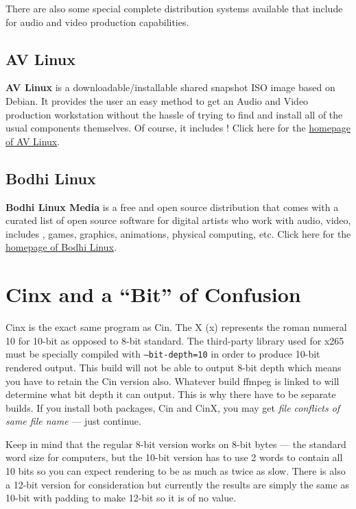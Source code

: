 There are also some special complete distribution systems
available that include \CGG{} for audio and video production
capabilities.

\subsection{AV Linux}
\label{sec:AV_Linux}

\textbf{AV Linux} is a downloadable/installable shared snapshot
ISO image based on Debian.  It provides the user an easy method to
get an Audio and Video production workstation without the hassle
of trying to find and install all of the usual components
themselves.  Of course, it includes \CGG{}!
%
Click here for the
\href{http://www.bandshed.net/avlinux/}{homepage of AV Linux}.

\subsection{Bodhi Linux}
\label{sec:Bodhi_Linux}

\textbf{Bodhi Linux Media} is a free and open source distribution that
comes with a curated list of open source software for digital
artists who work with audio, video, includes \CGG{}, games,
graphics, animations, physical computing, etc.
%
Click here for the
\href{https://gitlab.com/giuseppetorre/bodhilinuxmedia}{homepage of Bodhi Linux}.


\section{Cinx and a “Bit” of Confusion}%
\label{sec:cinx_and_a_bit_of_confusion}

Cinx is the exact same program as Cin.  The X (x) represents the
roman numeral 10 for 10-bit as opposed to 8-bit standard.  The
third-party library used for x265 must be specially compiled with
\texttt{--bit-depth=10} in order to produce 10-bit rendered
output.
%
This build will not be able to output 8-bit depth which means you
have to retain the Cin version also.
%
Whatever build ffmpeg is linked to will determine what bit depth
it can output.  This is why there have to be separate builds.  If
you install both packages, Cin and CinX, you may get \textit{file
  conflicts of same file name} --- just continue.

Keep in mind that the regular 8-bit version works on 8-bit bytes
--- the standard word size for computers, but the 10-bit version
has to use 2 words to contain all 10 bits so you can expect
rendering to be as much as twice as slow.
%
There is also a 12-bit version for consideration but currently the
results are simply the same as 10-bit with padding to make 12-bit
so it is of no value.


